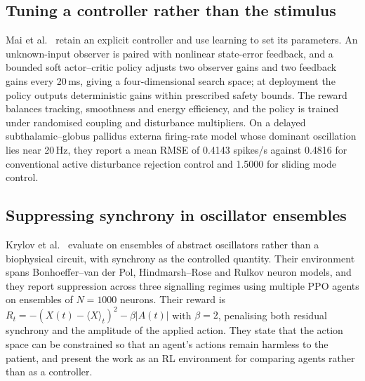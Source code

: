 \subsection*{Tuning a controller rather than the stimulus}

Mai et al.~\cite{mai2026personalized} retain an explicit controller and use
learning to set its parameters. An unknown-input observer is paired with
nonlinear state-error feedback, and a bounded soft actor--critic policy adjusts
two observer gains and two feedback gains every 20\,ms, giving a
four-dimensional search space; at deployment the policy outputs deterministic
gains within prescribed safety bounds. The reward balances tracking,
smoothness and energy efficiency, and the policy is trained under randomised
coupling and disturbance multipliers. On a delayed subthalamic--globus pallidus
externa firing-rate model whose dominant oscillation lies near 20\,Hz, they
report a mean RMSE of 0.4143 spikes/s against 0.4816 for conventional active
disturbance rejection control and 1.5000 for sliding mode control.


\subsection*{Suppressing synchrony in oscillator ensembles}

Krylov et al.~\cite{krylov2020framework} evaluate on ensembles of abstract
oscillators rather than a biophysical circuit, with synchrony as the
controlled quantity. Their environment spans Bonhoeffer--van der Pol,
Hindmarsh--Rose and Rulkov neuron models, and they report suppression across
three signalling regimes using multiple PPO agents on ensembles of $N = 1000$
neurons. Their reward is
$R_t = -(X(t) - \langle X \rangle_t)^2 - \beta |A(t)|$ with $\beta = 2$,
penalising both residual synchrony and the amplitude of the applied action.
They state that the action space can be constrained so that an agent's actions
remain harmless to the patient, and present the work as an RL environment for
comparing agents rather than as a controller.



